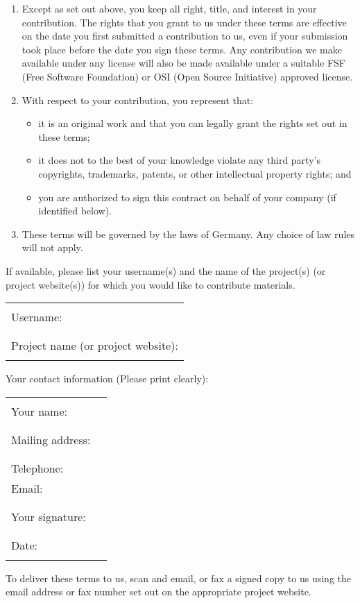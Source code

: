 \documentclass[12pt, a4paper]{article}
\begin{document}
\begin{enumerate}[leftmargin=15pt]
\item Except as set out above, you keep all right, title, and interest
  in your contribution. The rights that you grant to us under these
  terms are effective on the date you first submitted a contribution
  to us, even if your submission took place before the date you sign
  these terms. Any contribution we make available under any license
  will also be made available under a suitable FSF (Free Software
  Foundation) or OSI (Open Source Initiative) approved license.

\item With respect to your contribution, you represent that:
  \begin{itemize}[leftmargin=15pt]
  \item it is an original work and that you can legally grant the
    rights set out in these terms;
  \item it does not to the best of your knowledge violate any third
    party's copyrights, trademarks, patents, or other intellectual
    property rights; and
  \item you are authorized to sign this contract on behalf of your
    company (if identified below).
  \end{itemize}

\item These terms will be governed by the laws of Germany. Any choice
  of law rules will not apply.
\end{enumerate}

If available, please list your username(s) and the name of the
project(s) (or project website(s)) for which you would like to
contribute materials.\newline
\begin{tabularx}{\textwidth}{|X|}
  \hline
  \\
  Username:\\
  \\
  \hline
  \\
  Project name (or project website):\\
  \\
  \hline
\end{tabularx}
Your contact information (Please print clearly):\newline
\begin{tabularx}{\textwidth}{|X|l}
  \hline
  \\
  Your name:\\
  \\
  \hline
  \\
  Mailing address:\\
  \\
  \hline
  \\
  Telephone:\\
  Email:\\
  \\
  \hline
  \\
  Your signature:\\
  \\
  \hline
  \\
  Date:\\
  \\
  \hline

\end{tabularx}

To deliver these terms to us, scan and email, or fax a signed copy to
us using the email address or fax number set out on the appropriate
project website.
\end{document}
